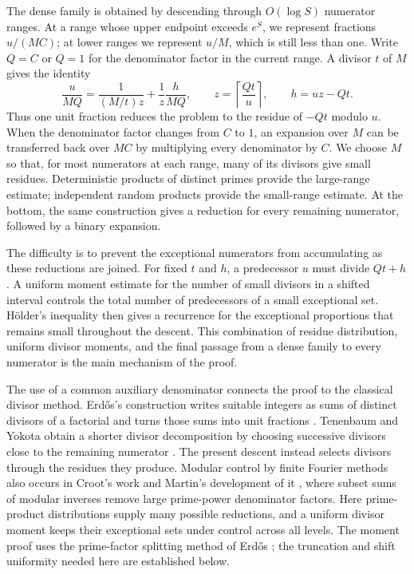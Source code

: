 The dense family is obtained by descending through $O(\log S)$
numerator ranges. At a range whose upper endpoint exceeds $e^S$, we
represent fractions $u/(MC)$; at lower ranges we represent $u/M$,
which is still less than one. Write $Q=C$ or $Q=1$ for the denominator
factor in the current range. A divisor $t$ of $M$ gives the identity
\[
 \frac{u}{MQ}
 =\frac1{(M/t)z}+\frac1z\frac{h}{MQ},
 \qquad z=\left\lceil\frac{Qt}{u}\right\rceil,
 \qquad h=uz-Qt.
\]
Thus one unit fraction reduces the problem to the residue of $-Qt$
modulo $u$. When the denominator factor changes from $C$ to $1$, an
expansion over $M$ can be transferred back over $MC$ by multiplying
every denominator by $C$. We choose $M$ so that, for most numerators
at each range, many of its divisors give small residues. Deterministic products of
distinct primes provide the large-range estimate; independent random
products provide the small-range estimate. At the bottom, the same
construction gives a reduction for every remaining numerator, followed
by a binary expansion.

The difficulty is to prevent the exceptional numerators from accumulating
as these reductions are joined. For fixed $t$ and $h$, a predecessor
$u$ must divide $Qt+h$. A uniform moment estimate for the number of
small divisors in a shifted interval controls the total number of
predecessors of a small exceptional set. H\"older's inequality then gives
a recurrence for the exceptional proportions that remains small throughout the descent.
This combination of residue distribution, uniform divisor moments,
and the final passage from a dense family to every numerator is the
main mechanism of the proof.

The use of a common auxiliary denominator connects the proof to the
classical divisor method. Erd\H{o}s's construction writes suitable
integers as sums of distinct divisors of a factorial and turns those
sums into unit fractions \cite[Section~1, pp.~199--203]{Erdos1950}.
Tenenbaum and Yokota obtain a shorter divisor decomposition by choosing
successive divisors close to the remaining numerator
\cite[Lemma~4 and Section~3]{TenenbaumYokota1990}.
The present descent instead selects divisors through the residues
they produce. Modular control by finite Fourier methods also occurs
in Croot's work \cite{Croot1999} and Martin's development of it
\cite[Section~4, Lemmas~11--13]{Martin2000}, where subset sums of
modular inverses remove large prime-power denominator factors.
Here prime-product distributions supply many possible reductions,
and a uniform divisor moment keeps their exceptional sets under
control across all levels. The moment proof uses the prime-factor
splitting method of Erd\H{o}s \cite[Section~3]{Erdos1952Divisors};
the truncation and shift uniformity needed here are established below.

